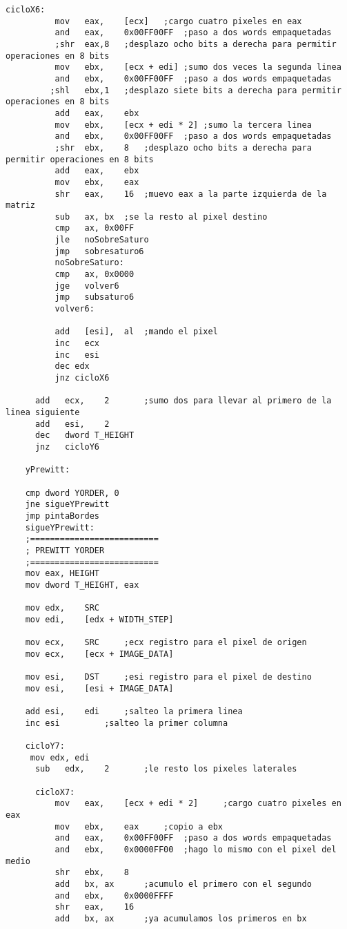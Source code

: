 \documentclass[11pt]{article}
\begin{document}
\begin{lstlisting}[frame=single]
	  cicloX6:
	      mov	eax,	[ecx]	;cargo cuatro pixeles en eax
	      and	eax,	0x00FF00FF	;paso a dos words empaquetadas
	      ;shr	eax,8	;desplazo ocho bits a derecha para permitir operaciones en 8 bits
	      mov	ebx,	[ecx + edi]	;sumo dos veces la segunda linea
	      and	ebx,	0x00FF00FF	;paso a dos words empaquetadas
	     ;shl	ebx,1	;desplazo siete bits a derecha para permitir operaciones en 8 bits
	      add	eax,	ebx
	      mov	ebx,	[ecx + edi * 2]	;sumo la tercera linea
	      and	ebx,	0x00FF00FF	;paso a dos words empaquetadas
	      ;shr	ebx,	8	;desplazo ocho bits a derecha para permitir operaciones en 8 bits
	      add	eax,	ebx
	      mov	ebx,	eax
	      shr	eax,	16	;muevo eax a la parte izquierda de la matriz
	      sub	ax,	bx	;se la resto al pixel destino
	      cmp	ax,	0x00FF
	      jle	noSobreSaturo
	      jmp	sobresaturo6
	      noSobreSaturo:
	      cmp	ax,	0x0000
	      jge	volver6
	      jmp	subsaturo6
	      volver6:

	      add	[esi],	al	;mando el pixel
	      inc	ecx
	      inc	esi
	      dec edx
	      jnz cicloX6

	  add	ecx,	2		;sumo dos para llevar al primero de la linea siguiente
	  add	esi,	2
	  dec	dword T_HEIGHT
	  jnz	cicloY6

	yPrewitt:

	cmp dword YORDER, 0
	jne	sigueYPrewitt
	jmp	pintaBordes
	sigueYPrewitt:
	;==========================
	; PREWITT YORDER
	;==========================
	mov eax, HEIGHT
	mov dword T_HEIGHT, eax

	mov	edx,	SRC
	mov	edi,	[edx + WIDTH_STEP]
	
	mov	ecx,	SRC		;ecx registro para el pixel de origen
	mov	ecx,	[ecx + IMAGE_DATA]

	mov	esi,	DST		;esi registro para el pixel de destino
	mov	esi,	[esi + IMAGE_DATA]

	add	esi,	edi		;salteo la primera linea
	inc	esi			;salteo la primer columna

	cicloY7:
	 mov edx, edi
	  sub	edx,	2		;le resto los pixeles laterales

	  cicloX7:
	      mov	eax,	[ecx + edi * 2]		;cargo cuatro pixeles en eax
	      mov	ebx,	eax		;copio a ebx
	      and	eax,	0x00FF00FF	;paso a dos words empaquetadas
	      and	ebx,	0x0000FF00	;hago lo mismo con el pixel del medio
	      shr	ebx,	8
	      add	bx,	ax		;acumulo el primero con el segundo
	      and	ebx,	0x0000FFFF
	      shr	eax,	16
	      add	bx,	ax		;ya acumulamos los primeros en bx


\end{lstlisting}
\end{document}
